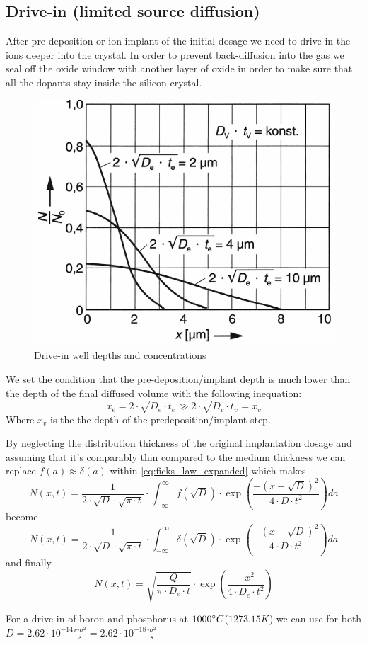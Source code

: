 \subsection{Drive-in (limited source diffusion)}\label{physics_drive_in}
After pre-deposition or ion implant of the initial dosage we need to drive in the ions deeper into the crystal.
In order to prevent back-diffusion into the gas we seal off the oxide window with another layer of oxide in order to make sure that all the dopants stay inside the silicon crystal.

\begin{figure}[H]
	\centering
	\includegraphics[scale=0.5]{dopants_drive_in_depth.png}
	\caption{Drive-in well depths and concentrations}
\end{figure}

We set the condition that the pre-deposition/implant depth is much lower than the depth of the final diffused volume with the following inequation:
\begin{equation}
x_e = 2 \cdot \sqrt{D_e \cdot t_e} \gg 2 \cdot \sqrt{D_v \cdot t_v} = x_v
\end{equation}
Where $x_v$ is the the depth of the predeposition/implant step.

By neglecting the distribution thickness of the original implantation dosage and assuming that it's comparably thin compared to the medium thickness we can replace  $f(a) \approx \delta(a)$ within \autoref{eq:ficks_law_expanded} which makes
\begin{equation}
N(x,t) = \frac{1}{2 \cdot \sqrt{D} \cdot \sqrt{\pi \cdot t}} \cdot \int_{-\infty}^{\infty}{f(\sqrt{D})\cdot\exp\left(\frac{-(x-\sqrt{D})^2}{4 \cdot D \cdot t^2}\right)}da
\end{equation}
become
\begin{equation}
N(x,t)
=
\frac{1}{2 \cdot \sqrt{D} \cdot \sqrt{\pi \cdot t}} \cdot \int_{-\infty}^{\infty}{\delta(\sqrt{D})\cdot\exp\left(\frac{-(x-\sqrt{D})^2}{4 \cdot D \cdot t^2}\right)}da
\end{equation}
and finally
\begin{equation}
N(x,t)
=
\sqrt{\frac{Q}{\pi \cdot D_e \cdot t}} \cdot \exp\left(\frac{-x^2}{4 \cdot D_e \cdot t^2}\right)
\end{equation}

For a drive-in of boron and phosphorus at $1000\degree C$($1273.15 K$) we can use for both $D=2.62 \cdot 10^{-14} \frac{cm^2 }{s}=2.62 \cdot 10^{-18} \frac{m^2 }{s}$

